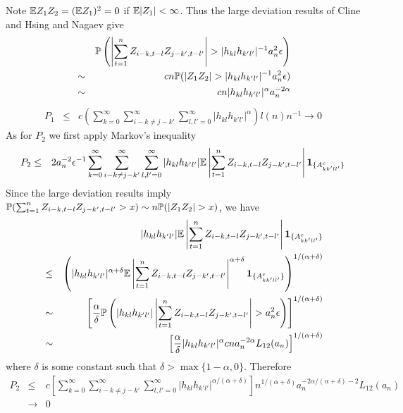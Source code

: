 \documentclass{article}
\begin{document}
Note $\mathbb{E} Z_1 Z_2 = (\mathbb{E} Z_1)^2 = 0$ if $\mathbb{E}|Z_1| < \infty$. Thus the
large deviation results of Cline and Hsing \cite{ClingHsing1998} and
Nagaev \cite{nagaev1979} give
\begin{eqnarray*}
  && \mathbb{P}\left(
    \left| \sum_{t=1}^n  Z_{i-k,t-l} Z_{j-k',t-l'}
    \right| > | h_{kl} h_{k'l'}|^{-1} a_n^2 \epsilon 
  \right) \\
  &\sim& c n \mathbb{P}(|Z_1 Z_2| > | h_{kl} h_{k'l'}|^{-1} a_n^2 \epsilon) \\
  &\sim& c n | h_{kl} h_{k'l'}|^{\alpha} a_n^{-2\alpha}
\end{eqnarray*}
\begin{eqnarray*}
  P_1 &\leq& c \left( \sum_{k=0}^\infty \sum_{i-k \neq j-k'}^\infty
  \sum_{l,l'=0}^\infty | h_{kl} h_{k'l'}|^{\alpha} \right) l(n) n^{-1}
\to 0
\end{eqnarray*}
As for $P_2$ we first apply Markov's inequality
\begin{eqnarray*}
  P_2 &\leq& 2 a_n^{-2} \epsilon^{-1}
  \sum_{k=0}^\infty \sum_{i-k \neq j-k'}^\infty
  \sum_{l,l'=0}^\infty | h_{kl} h_{k'l'}| \mathbb{E} \left|
  \sum_{t=1}^n  Z_{i-k,t-l} Z_{j-k',t-l'} \right|
  \mathbf{1}_{\{A^c_{kk'll'}\}}
\end{eqnarray*}
Since the large deviation results imply $\mathbb{P}(\sum_{t=1}^n  Z_{i-k,t-l}
Z_{j-k',t-l'} > x) \sim n \mathbb{P}(|Z_1 Z_2| > x)$, we have
\begin{eqnarray*}
  && | h_{kl} h_{k'l'}| \mathbb{E} \left| \sum_{t=1}^n  Z_{i-k,t-l} Z_{j-k',t-l'} \right|
  \mathbf{1}_{\{A^c_{kk'll'}\}} \\
  &\leq& \left(
    | h_{kl} h_{k'l'}|^{\alpha + \delta} \mathbb{E} \left| \sum_{t=1}^n
      Z_{i-k,t-l} Z_{j-k',t-l'} \right|^{\alpha + \delta}
    \mathbf{1}_{\{A^c_{kk'll'}\}} \right)^{1/(\alpha + \delta)} \\
    &\sim& \left[
      {\alpha \over \delta} \mathbb{P}\left(
      | h_{kl} h_{k'l'}| \left| \sum_{t=1}^n  Z_{i-k,t-l} Z_{j-k',t-l'}
      \right| > a_n^2 \epsilon \right) \right]^{1/(\alpha + \delta)} \\
  &\sim& \left[
    {\alpha \over \delta} | h_{kl} h_{k'l'}|^{\alpha}
    c n a_n^{-2\alpha} L_{12}(a_n)
    \right]^{1/(\alpha + \delta)}
\end{eqnarray*}
where $\delta$ is some constant such that $\delta > \max\{1-\alpha,
0\}$. Therefore
\begin{eqnarray*}
  P_2 &\leq& c  \left[\sum_{k=0}^\infty \sum_{i-k \neq j-k'}^\infty
  \sum_{l,l'=0}^\infty |h_{kl} h_{k'l'}|^{\alpha/(\alpha + \delta)}\right]
  n^{1/(\alpha + \delta)} a_n^{-2\alpha/(\alpha + \delta )-2} L_{12}(a_n)\\
  &\to&  0
\end{eqnarray*}
\end{document}
